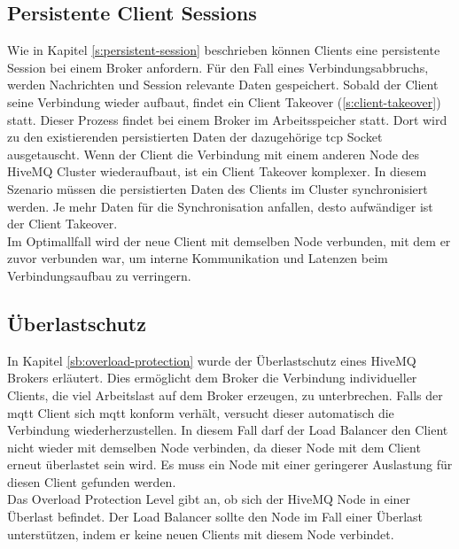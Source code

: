 \subsection{Persistente Client Sessions} \label{sp:persistent-session}
Wie in Kapitel \ref{s:persistent-session} beschrieben können Clients eine persistente Session bei einem Broker anfordern.
Für den Fall eines Verbindungsabbruchs, werden Nachrichten und Session relevante Daten gespeichert.
Sobald der Client seine Verbindung wieder aufbaut, findet ein Client Takeover (\ref{s:client-takeover}) statt.
Dieser Prozess findet bei einem Broker im Arbeitsspeicher statt.
Dort wird zu den existierenden persistierten Daten der dazugehörige \ac{tcp} Socket ausgetauscht.
Wenn der Client die Verbindung mit einem anderen Node des HiveMQ Cluster wiederaufbaut, ist ein Client Takeover komplexer.
In diesem Szenario müssen die persistierten Daten des Clients im Cluster synchronisiert werden.
Je mehr Daten für die Synchronisation anfallen, desto aufwändiger ist der Client Takeover.
\\
Im Optimallfall wird der neue Client mit demselben Node verbunden, mit dem er zuvor verbunden war, um interne Kommunikation und Latenzen beim Verbindungsaufbau zu verringern.

\subsection{Überlastschutz}
In Kapitel \ref{sb:overload-protection} wurde der Überlastschutz eines HiveMQ Brokers erläutert. Dies ermöglicht dem Broker die Verbindung individueller Clients, die viel Arbeitslast auf dem Broker erzeugen, zu unterbrechen. Falls der \ac{mqtt} Client sich \ac{mqtt} konform verhält, versucht dieser automatisch die Verbindung wiederherzustellen.
In diesem Fall darf der Load Balancer den Client nicht wieder mit demselben Node verbinden, da dieser Node mit dem Client erneut überlastet sein wird. Es muss ein Node mit einer geringerer Auslastung für diesen Client gefunden werden.
\\
Das Overload Protection Level gibt an, ob sich der HiveMQ Node in einer Überlast befindet.
Der Load Balancer sollte den Node im Fall einer Überlast unterstützen, indem er keine neuen Clients mit diesem Node verbindet.

